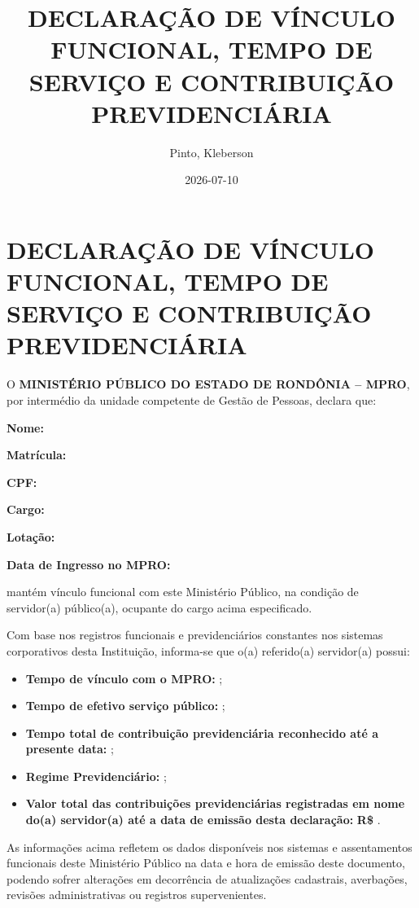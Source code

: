 \documentclass[
]{article}
\title{DECLARAÇÃO DE VÍNCULO FUNCIONAL, TEMPO DE SERVIÇO E CONTRIBUIÇÃO
PREVIDENCIÁRIA}
\author{Pinto, Kleberson}
\date{2026-07-10}
\providecommand{\tightlist}{%
  \setlength{\itemsep}{0pt}\setlength{\parskip}{0pt}}
\begin{document}
\maketitle

\section{DECLARAÇÃO DE VÍNCULO FUNCIONAL, TEMPO DE SERVIÇO E
CONTRIBUIÇÃO
PREVIDENCIÁRIA}\label{declarauxe7uxe3o-de-vuxednculo-funcional-tempo-de-serviuxe7o-e-contribuiuxe7uxe3o-previdenciuxe1ria}

O \textbf{MINISTÉRIO PÚBLICO DO ESTADO DE RONDÔNIA -- MPRO}, por
intermédio da unidade competente de Gestão de Pessoas, declara que:

\textbf{Nome:}

\textbf{Matrícula:}

\textbf{CPF:}

\textbf{Cargo:}

\textbf{Lotação:}

\textbf{Data de Ingresso no MPRO:}

mantém vínculo funcional com este Ministério Público, na condição de
servidor(a) público(a), ocupante do cargo acima especificado.

Com base nos registros funcionais e previdenciários constantes nos
sistemas corporativos desta Instituição, informa-se que o(a) referido(a)
servidor(a) possui:

\begin{itemize}
\tightlist
\item
  \textbf{Tempo de vínculo com o MPRO:} ;
\item
  \textbf{Tempo de efetivo serviço público:} ;
\item
  \textbf{Tempo total de contribuição previdenciária reconhecido até a
  presente data:} ;
\item
  \textbf{Regime Previdenciário:} ;
\item
  \textbf{Valor total das contribuições previdenciárias registradas em
  nome do(a) servidor(a) até a data de emissão desta declaração:}
  \textbf{R\$ }.
\end{itemize}

As informações acima refletem os dados disponíveis nos sistemas e
assentamentos funcionais deste Ministério Público na data e hora de
emissão deste documento, podendo sofrer alterações em decorrência de
atualizações cadastrais, averbações, revisões administrativas ou
registros supervenientes.
\end{document}
